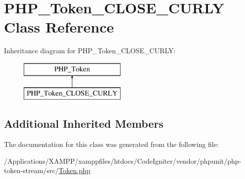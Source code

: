 \hypertarget{class_p_h_p___token___c_l_o_s_e___c_u_r_l_y}{}\section{P\+H\+P\+\_\+\+Token\+\_\+\+C\+L\+O\+S\+E\+\_\+\+C\+U\+R\+LY Class Reference}
\label{class_p_h_p___token___c_l_o_s_e___c_u_r_l_y}
Inheritance diagram for P\+H\+P\+\_\+\+Token\+\_\+\+C\+L\+O\+S\+E\+\_\+\+C\+U\+R\+LY\+:\begin{figure}[H]
\begin{center}
\leavevmode
\includegraphics[height=2.000000cm]{class_p_h_p___token___c_l_o_s_e___c_u_r_l_y}
\end{center}
\end{figure}
\subsection*{Additional Inherited Members}


The documentation for this class was generated from the following file\+:\begin{DoxyCompactItemize}
\item 
/\+Applications/\+X\+A\+M\+P\+P/xamppfiles/htdocs/\+Code\+Igniter/vendor/phpunit/php-\/token-\/stream/src/\mbox{\hyperlink{_token_8php}{Token.\+php}}\end{DoxyCompactItemize}
